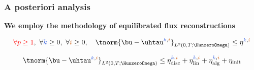 %
\begin{frame}
\frametitle{A posteriori analysis}
\textcolor{cadmiumgreen}{\textbf{We employ the methodology of equilibrated flux reconstructions}}
\vspace{0.4 cm}
\begin{theorem}
\begin{equation*}
\textcolor{red}{\forall p \geq 1}, \ \forall \kk \geq 0, \ \forall \ii \geq 0, \quad \tnorm{\bu-\uhtau^{\kk,\ii}}_{L^2(0,T;\HunzeroOmega)}  \leq \eta^{\kk,\ii}
\end{equation*}
\end{theorem}
\vspace{0.4 cm}
\begin{corollary}
\begin{equation*}
\tnorm{\bu-\uhtau^{\kk,\ii}}_{L^2(0,T;\HunzeroOmega)}  \leq \eta_{\mathrm{disc}}^{\kk,\ii} + \eta_{\mathrm{lin}}^{\kk,\ii} + \eta_{\mathrm{alg}}^{\kk,\ii} + \eta_{\mathrm{init}}
\end{equation*}
\end{corollary}
\end{frame}
%

